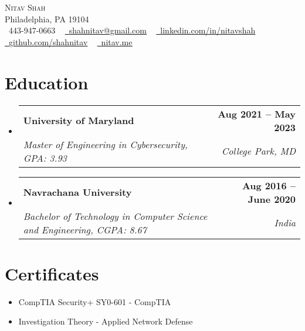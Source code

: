 \documentclass[letterpaper,11pt]{article}
\makeatletter
\newcommand{\resumeSubheading}[4]{
  \vspace{-2pt}\item
    \begin{tabular*}{1.0\textwidth}[t]{l@{\extracolsep{\fill}}r}
      \textbf{#1} & \textbf{\small #2} \\
      \textit{\small#3} & \textit{\small #4} \\
    \end{tabular*}\vspace{-7pt}
}
\newcommand{\resumeSubHeadingListStart}{\begin{itemize}[leftmargin=0.0in, label={}]}
\newcommand{\resumeSubHeadingListEnd}{\end{itemize}}
\makeatother
\begin{document}
\begin{center}
    {\Huge \scshape Nitav Shah} \\ \vspace{1pt}
    Philadelphia, PA 19104 \\ \vspace{1pt}
    \small \raisebox{-0.1\height}\faPhone\ 443-947-0663 ~ \href{mailto:shahnitav@gmail.com}{\raisebox{-0.2\height}\faEnvelope\  \underline{shahnitav@gmail.com}} ~ 
    \href{https://linkedin.com/in/nitavshah/}{\raisebox{-0.2\height}\faLinkedin\ \underline{linkedin.com/in/nitavshah}}  ~
    \href{https://github.com/shahnitav}{\raisebox{-0.2\height}\faGithub\ \underline{github.com/shahnitav}}  ~
    \href{https://nitav.me}{\raisebox{-0.2\height}\faGlobe\
    \underline{nitav.me}}
    \vspace{-8pt}
\end{center}


\section{Education}
  \resumeSubHeadingListStart
    \resumeSubheading
      {University of Maryland}{Aug 2021 -- May 2023}
      {Master of Engineering in Cybersecurity, GPA: 3.93}{College Park, MD}
  \resumeSubHeadingListEnd
\vspace{-6pt}
  \resumeSubHeadingListStart
    \resumeSubheading
      {Navrachana University}{Aug 2016 -- June 2020}
      {Bachelor of Technology in Computer Science and Engineering, CGPA: 8.67}{India}
  \resumeSubHeadingListEnd
\vspace{-12pt}
\section{Certificates}
        \begin{itemize}
            \item CompTIA Security+ SY0-601 - CompTIA
            \vspace{-10pt}
            \item Investigation Theory - Applied Network Defense
        \end{itemize}
\vspace{-18pt}
\end{document}
